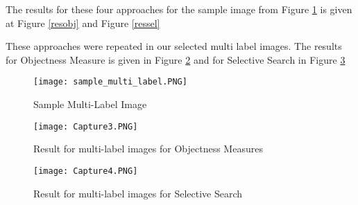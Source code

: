 The results for these four approaches for the sample image from Figure \ref{sample_multi_label} is given at Figure \ref{resobj} and Figure \ref{ressel} \hfill \break


These approaches were repeated in our selected multi label images. The results for Objectness Measure is given in Figure \ref{finobj} and for Selective Search in Figure  \ref{finsel}

\begin{figure}[h!]
  \centering
  \texttt{[image: sample\_multi\_label.PNG]}
  \caption{Sample Multi-Label Image}\label{sample_multi_label}
\end{figure}


\begin{figure}[h!]
  \centering
  \texttt{[image: Capture3.PNG]}
  \caption{Result for multi-label images for Objectness Measures}\label{finobj}
\end{figure}


\begin{figure}[h!]
  \centering
  \texttt{[image: Capture4.PNG]}
  \caption {Result for multi-label images for Selective Search}\label{finsel}
\end{figure}

